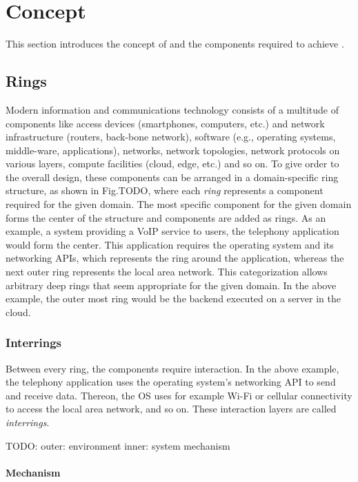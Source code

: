 \section{Concept}
\label{sec:design}

This section introduces the concept of \mm and the components required to achieve \mm.

\subsection{Rings}
Modern information and communications technology consists of a multitude of components like access devices (smartphones, computers, etc.) and network infrastructure (routers, back-bone network), software (e.g., operating systems, middle-ware, applications), networks, network topologies, network protocols on various layers, compute facilities (cloud, edge, etc.) and so on.
To give order to the overall design, these components can be arranged in a domain-specific ring structure, as shown in Fig.TODO, where each \emph{ring} represents a component required for the given domain.
The most specific component for the given domain forms the center of the structure and components are added as rings.
As an example, a system providing a VoIP service to users, the telephony application would form the center.
This application requires the operating system and its networking APIs, which represents the ring around the application, whereas the next outer ring represents the local area network.
This categorization allows arbitrary deep rings that seem appropriate for the given domain.
In the above example, the outer most ring would be the backend executed on a server in the cloud.


\subsubsection{Interrings}
Between every ring, the components require interaction.
In the above example, the telephony application uses the operating system's networking API to send and receive data.
Thereon, the OS uses for example Wi-Fi or cellular connectivity to access the local area network, and so on.
These interaction layers are called \emph{interrings}.

TODO:
\mm
\env
outer: environment
inner: system
mechanism








\paragraph{Mechanism}

